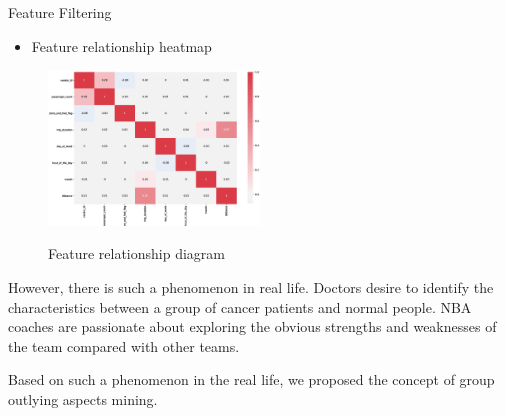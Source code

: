 \documentclass[
 size=14pt,
 paper=smartboard,  %
 mode=present, 		%
 display=slides, 	%
 style=tuliplab,  	%
 pauseslide,
 fleqn,leqno]{powerdot}
\begin{document}





\begin{slide}[toc=,bm=]{Feature Filtering}

\begin{itemize}
\item
Feature relationship heatmap
\end{itemize}

\begin{figure}
  \centering
   \includegraphics[width=0.5\textwidth]{figure//fig-6.eps}\\
  \caption{Feature relationship diagram}\label{fig:demical}
\end{figure}


\begin{note}
However,
there is such a phenomenon in real life.
Doctors desire to identify the characteristics between
a group of cancer patients and normal people.
NBA coaches are passionate about exploring the obvious strengths and
weaknesses of the team compared with other teams.

Based on such a phenomenon in the real life,
we proposed the concept of group outlying aspects mining.
\end{note}

\end{slide}

\end{document}
